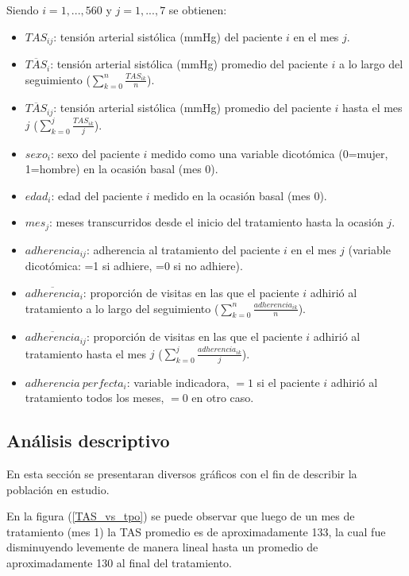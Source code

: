 \documentclass[spanish]{article}
\numberwithin{figure}{subsection}
\numberwithin{equation}{subsection}
\numberwithin{table}{subsection}
\def\npatients{560}
\begin{document}
Siendo $ i = 1, ..., \npatients{}$ y $j = 1, ..., 7$ se obtienen:

\begin{itemize}
	\item $TAS_{ij}$: tensión arterial sistólica (mmHg) del paciente $i$ en el
	mes $j$.
	\item $\overline{TAS}_{i}$: tensión arterial sistólica (mmHg) promedio del
	paciente $i$ a lo largo del seguimiento ($\sum_{k=0}^n \frac{TAS_{ik}}{n}$).
	\item $\overline{TAS}_{ij}$: tensión arterial sistólica (mmHg) promedio del
	paciente $i$ hasta el mes $j$ ($\sum_{k=0}^j \frac{TAS_{ik}}{j}$).
	\item $sexo_i$: sexo del paciente $i$ medido como una variable dicotómica
	(0=mujer, 1=hombre) en la ocasión basal (mes 0).
	\item $edad_i$: edad del paciente $i$ medido en la ocasión basal (mes 0).
	\item $mes_j$: meses transcurridos desde el inicio del tratamiento hasta la
	ocasión $j$.
	\item $adherencia_{ij}$: adherencia al tratamiento del paciente $i$ en el
	mes $j$ (variable dicotómica: =1 si adhiere, =0 si no adhiere).
	\item $\overline{adherencia}_i$: proporción de visitas en las que el
	paciente $i$ adhirió al tratamiento a lo largo del seguimiento
	($\sum_{k=0}^n \frac{adherencia_{ik}}{n}$).
	\item $\overline{adherencia}_{ij}$: proporción de visitas en las que el
	paciente $i$ adhirió al tratamiento hasta el mes $j$ ($\sum_{k=0}^j
	\frac{adherencia_{ik}}{j}$).
	\item $adherencia\ perfecta_i$: variable indicadora, $=1$ si el paciente
	$i$ adhirió al tratamiento todos los meses, $=0$ en otro caso.
\end{itemize}

\subsection{Análisis descriptivo}

En esta sección se presentaran diversos gráficos con el fin de describir la
población en estudio.

En la figura (\ref{TAS_vs_tpo}) se puede observar que luego de un mes de
tratamiento (mes 1) la TAS promedio es de aproximadamente 133, la cual fue
disminuyendo levemente de manera lineal hasta un promedio de aproximadamente 130
al final del tratamiento.
\end{document}
